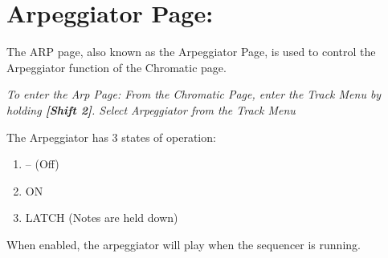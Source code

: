 \chapter{Arpeggiator Page:}
The ARP page, also known as the Arpeggiator Page, is used to control the Arpeggiator function of the Chromatic page.


\textit{To enter the Arp Page: From the Chromatic Page, enter the Track Menu by holding \textbf{[Shift 2]}. Select Arpeggiator from the Track Menu }


The Arpeggiator has 3 states of operation:
\begin{enumerate}
    \item -- (Off)
    \item ON
    \item LATCH (Notes are held down)
\end{enumerate}

When enabled, the arpeggiator will  play when the sequencer is running. 

